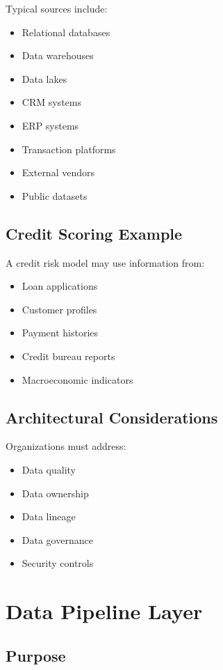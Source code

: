 Typical sources include:

\begin{itemize}
    \item Relational databases
    \item Data warehouses
    \item Data lakes
    \item CRM systems
    \item ERP systems
    \item Transaction platforms
    \item External vendors
    \item Public datasets
\end{itemize}

\subsection{Credit Scoring Example}

A credit risk model may use information from:

\begin{itemize}
    \item Loan applications
    \item Customer profiles
    \item Payment histories
    \item Credit bureau reports
    \item Macroeconomic indicators
\end{itemize}

\subsection{Architectural Considerations}

Organizations must address:

\begin{itemize}
    \item Data quality
    \item Data ownership
    \item Data lineage
    \item Data governance
    \item Security controls
\end{itemize}

\section{Data Pipeline Layer}

\subsection{Purpose}

